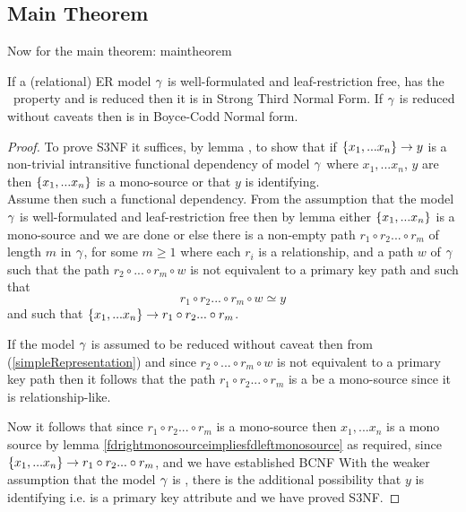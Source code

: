 \subsection{Main Theorem}
\noindent Now for the main theorem:
maintheorem
\begin{theorem}
\noindent If a (relational) ER model $\gamma$ is well-formulated and leaf-restriction free, has the \fdfactoring\ property and is reduced then it is in Strong Third Normal Form. 
If  $\gamma$ is reduced without caveats then is in Boyce-Codd Normal form.
\end{theorem}
\begin{proof}
To prove S3NF it suffices, by lemma ,  to show that if 
$\left\{x_1,...x_n\right\} \rightarrow y$ is a non-trivial intransitive functional dependency of model $\gamma$
where $x_1,...x_n$, $y$ are  
then  $\left\{x_1,...x_n\right\}$ is a mono-source or that $y$ is identifying. \\
Assume then such a functional dependency.
From the assumption that the model $\gamma$ is well-formulated and leaf-restriction free
then by lemma  
either $\left\{x_1,...x_n\right\}$ is a mono-source and we are done
or else there is a non-empty  path $r_1 \circ r_2 ... \circ r_m$ 
of length $m$ in $\gamma$, for some $m \geq 1$  where each $r_i$ is a relationship,
and a path $w$ of $\gamma$ 
such that the path $r_2 \circ ... \circ r_m \circ w$
 is not  equivalent to a primary key path and such that 
\begin{equation}
\label{simpleRepresentation}
 r_1 \circ r_2 ... \circ r_m \circ w \simeq y
\end{equation}
and such that $\left\{x_1,...x_n\right\} \rightarrow r_1 \circ r_2 ... \circ r_m$. 

If the model $\gamma$ is assumed to be reduced without caveat then from (\ref{simpleRepresentation})
and since $r_2 \circ ... \circ r_m \circ w$
 is not  equivalent to a primary key path then it follows that the path $r_1 \circ r_2 ... \circ r_m$ is a be a mono-source
since it is relationship-like.

Now it follows that since $r_1 \circ r_2 ... \circ r_m$ is a mono-source then $x_1,...x_n$ is a mono source by lemma \ref{fdrightmonosourceimpliesfdleftmonosource} as required, 
since $\left\{x_1,...x_n\right\} \rightarrow r_1\circ r_2 ... \circ r_m$, and we have established BCNF
With the weaker assumption that the model $\gamma$ is , there is the additional possibility that $y$ is identifying i.e. is a primary key attribute and we have proved S3NF.
\end{proof}


